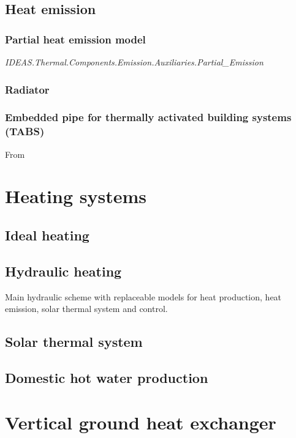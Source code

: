 \subsection{Heat emission}

\subsubsection{Partial heat emission model}

\emph{IDEAS.Thermal.Components.Emission.Auxiliaries.Partial_Emission}
\vspace{6mm}

\subsubsection{Radiator}

\subsubsection{Embedded pipe for thermally activated building systems (TABS)}

From ~\cite{Koschenz2000}

\section{Heating systems}

\subsection{Ideal heating}

\subsection{Hydraulic heating}

Main hydraulic scheme with replaceable models for heat production, heat emission, solar thermal system and control.

\subsection{Solar thermal system}

\subsection{Domestic hot water production}

\section{Vertical ground heat exchanger}

